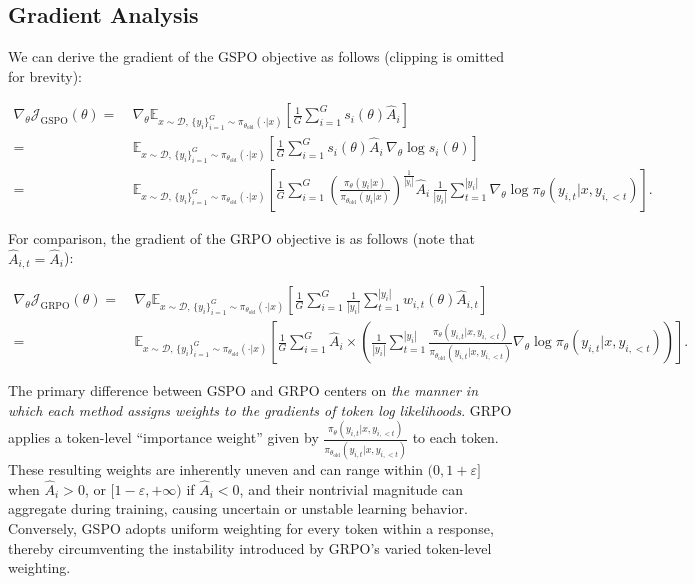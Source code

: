 \subsection{Gradient Analysis}
\label{subsec:gradient}

We can derive the gradient of the GSPO objective as follows (clipping is omitted for brevity):

\begin{align}
\nabla_{\theta} \mathcal{J}_\text{GSPO} (\theta)
=&\ 
\nabla_{\theta} \mathbb{E}_{ x \sim \mathcal{D},\, \{y_i\}_{i=1}^G \sim \pi_{\theta_\text{old}}( \cdot | x) }
\left[ 
\frac{1}{G} \sum_{i=1}^{G} s_{i}(\theta) \widehat{A}_{i}
\right] \\
= &\ 
\mathbb{E}_{ x \sim \mathcal{D},\, \{y_i\}_{i=1}^G \sim \pi_{\theta_\text{old}}( \cdot | x) }
\left[ 
\frac{1}{G} \sum_{i=1}^{G}
s_{i}(\theta) \widehat{A}_{i}
\, \nabla_{\theta} \log s_{i}(\theta)
\right] \\
=&\ 
\mathbb{E}_{ x \sim \mathcal{D},\, \{y_i\}_{i=1}^G \sim \pi_{\theta_\text{old}}( \cdot | x) }
\left[ 
\frac{1}{G} \sum_{i=1}^{G} 
\left( \frac{ \pi_{\theta} (y_i | x) }{ \pi_{\theta_\text{old}} (y_i | x)} \right)^{\frac{1}{|y_i|}} \widehat{A}_{i} 
\, \frac{1}{|y_i|} \sum_{t=1}^{|y_i|} \nabla_{\theta} \log \pi_{\theta} (y_{i,t} | x, y_{i,<t}) 
\right].
\label{equ:gspo_grad}
\end{align}

For comparison, the gradient of the GRPO objective is as follows (note that $\widehat{A}_{i,t} = \widehat{A}_{i}$):

\begin{align}
\nabla_{\theta} \mathcal{J}_\text{GRPO} (\theta) 
=&\ 
\nabla_{\theta} \mathbb{E}_{ x \sim \mathcal{D},\, \{y_i\}_{i=1}^G \sim \pi_{\theta_\text{old}}( \cdot | x) }
\left[ \frac{1}{G} \sum_{i=1}^{G} \frac{1}{|y_i|} \sum_{t=1}^{|y_i|} 
w_{i,t}(\theta) \widehat{A}_{i,t}
\right] \\
=&\
\mathbb{E}_{ x \sim \mathcal{D},\, \{y_i\}_{i=1}^G \sim \pi_{\theta_\text{old}}( \cdot | x) }
\left[ \frac{1}{G} \sum_{i=1}^{G} \widehat{A}_{i} 
\times \left(\frac{1}{|y_i|} \sum_{t=1}^{|y_i|} 
\frac{ \pi_{\theta} (y_{i,t} | x, y_{i,<t}) }{ \pi_{\theta_\text{old}} (y_{i,t} | x,y_{i,<t})} 
\nabla_{\theta} \log \pi_{\theta} (y_{i,t} | x, y_{i,<t}) \right)
\right].
\end{align}

The primary difference between GSPO and GRPO centers on \textit{the manner in which each method assigns weights to the gradients of token log likelihoods}. GRPO applies a token-level ``importance weight'' given by $\frac{ \pi_{\theta} (y_{i,t} | x, y_{i,<t}) }{ \pi_{\theta_\text{old}} (y_{i,t} | x,y_{i,<t})}$ to each token. These resulting weights are inherently uneven and can range within $(0, 1+\varepsilon]$ when $\widehat{A}_{i} > 0$, or $[1-\varepsilon, +\infty)$ if $\widehat{A}_{i} < 0$, and their nontrivial magnitude can aggregate during training, causing uncertain or unstable learning behavior. Conversely, GSPO adopts uniform weighting for every token within a response, thereby circumventing the instability introduced by GRPO's varied token-level weighting.

